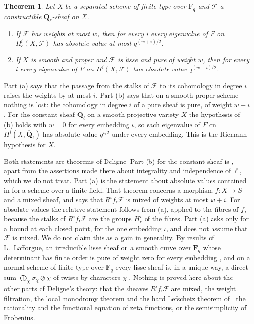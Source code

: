 \documentclass[11pt,a4paper]{article}
\theoremstyle{plain}
\newtheorem{theorem}{Theorem}
\theoremstyle{remark}
\newcommand{\Fq}{\mathbf F_q}
\newcommand{\Ql}{\overline{\mathbf Q}_\ell}
\newcommand{\F}{\mathcal F}
\begin{document}
\begin{theorem}\label{thm:main}
Let $X$ be a separated scheme of finite type over $\Fq$ and $\F$ a constructible $\Ql$-sheaf on $X$.
\begin{enumerate}
\item[(a)] If $\F$ has weights at most $w$, then for every $i$ every eigenvalue of $F$ on $H^i_c(X,\F)$ has absolute
value at most $q^{(w+i)/2}$.
\item[(b)] If $X$ is smooth and proper and $\F$ is lisse and pure of weight $w$, then for every $i$ every eigenvalue
of $F$ on $H^i(X,\F)$ has absolute value $q^{(w+i)/2}$.
\end{enumerate}
\end{theorem}

Part (a) says that the passage from the stalks of $\F$ to its cohomology in degree $i$ raises the weights by at most
$i$. Part (b) says that on a smooth proper scheme nothing is lost: the cohomology in degree $i$ of a pure sheaf is
pure, of weight $w+i$. For the constant sheaf $\Ql$ on a smooth projective variety $X$ the hypothesis of (b) holds
with $w=0$ for every embedding $\iota$, so each eigenvalue of $F$ on $H^i(X,\Ql)$ has absolute value $q^{i/2}$ under
every embedding. This is the Riemann hypothesis for $X$.

Both statements are theorems of Deligne. Part (b) for the constant sheaf is \cite[Th\'eor\`eme 1.6]{WeilI}, apart
from the assertions made there about integrality and independence of $\ell$, which we do not treat. Part (a) is the
statement about absolute values contained in \cite[Th\'eor\`eme 3.3.1]{WeilII} for a scheme over a finite field. That
theorem concerns a morphism $f:X\to S$ and a mixed sheaf, and says that $R^if_!\F$ is mixed of weights at most $w+i$.
For absolute values the relative statement follows from (a), applied to the fibres of $f$, because the stalks of
$R^if_!\F$ are the groups $H^i_c$ of the fibres. Part (a) asks only for a bound at each closed point, for the one
embedding $\iota$, and does not assume that $\F$ is mixed. We do not claim this as a gain in generality. By results
of L.~Lafforgue, an irreducible lisse sheaf on a smooth curve over $\Fq$ whose determinant has finite order is pure
of weight zero for every embedding \cite[Th\'eor\`eme VII.6 (ii)]{Lafforgue}, and on a normal scheme of finite type
over $\Fq$ every lisse sheaf is, in a unique way, a direct sum $\bigoplus_\chi\sigma_\chi\otimes\chi$ of twists by
characters $\chi$ \cite[Corollaire VII.8]{Lafforgue}. Nothing is proved here about the other parts of Deligne's
theory: that the sheaves $R^if_!\F$ are mixed, the weight filtration, the local monodromy theorem and the hard
Lefschetz theorem of \cite{WeilII}, the rationality and the functional equation of zeta functions, or the
semisimplicity of Frobenius.
\end{document}
